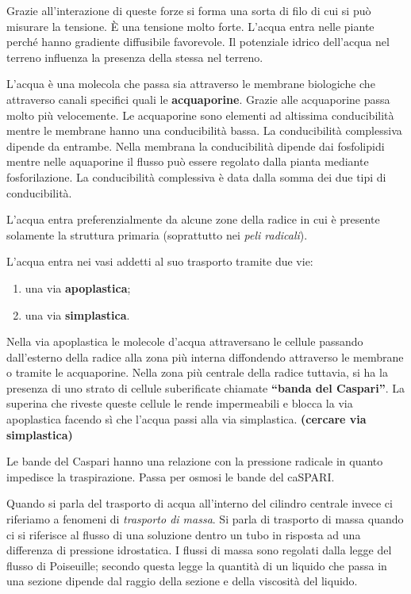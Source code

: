 \documentclass[]{article}
\begin{document}
Grazie all'interazione di queste forze si forma una sorta di filo di cui
si può misurare la tensione. È una tensione molto forte. L'acqua entra
nelle piante perché hanno gradiente diffusibile favorevole. Il
potenziale idrico dell'acqua nel terreno influenza la presenza della
stessa nel terreno.

L'acqua è una molecola che passa sia attraverso le membrane biologiche
che attraverso canali specifici quali le \textbf{acquaporine}. Grazie
alle acquaporine passa molto più velocemente. Le acquaporine sono
elementi ad altissima conducibilità mentre le membrane hanno una
conducibilità bassa. La conducibilità complessiva dipende da entrambe.
Nella membrana la conducibilità dipende dai fosfolipidi mentre nelle
aquaporine il flusso può essere regolato dalla pianta mediante
fosforilazione. La conducibilità complessiva è data dalla somma dei due
tipi di conducibilità.

L'acqua entra preferenzialmente da alcune zone della radice in cui è
presente solamente la struttura primaria (soprattutto nei \emph{peli
radicali}).

L'acqua entra nei vasi addetti al suo trasporto tramite due vie:

\begin{enumerate}
\def\labelenumi{\arabic{enumi}.}
\itemsep1pt\parskip0pt
\item
  una via \textbf{apoplastica};
\item
  una via \textbf{simplastica}.
\end{enumerate}

Nella via apoplastica le molecole d'acqua attraversano le cellule
passando dall'esterno della radice alla zona più interna diffondendo
attraverso le membrane o tramite le acquaporine. Nella zona più centrale
della radice tuttavia, si ha la presenza di uno strato di cellule
suberificate chiamate \textbf{``banda del Caspari''}. La superina che
riveste queste cellule le rende impermeabili e blocca la via apoplastica
facendo sì che l'acqua passi alla via simplastica. \textbf{(cercare via
simplastica)}

Le bande del Caspari hanno una relazione con la pressione radicale in
quanto impedisce la traspirazione. Passa per osmosi le bande del
caSPARI.

Quando si parla del trasporto di acqua all'interno del cilindro centrale
invece ci riferiamo a fenomeni di \emph{trasporto di massa}. Si parla di
trasporto di massa quando ci si riferisce al flusso di una soluzione
dentro un tubo in risposta ad una differenza di pressione idrostatica. I
flussi di massa sono regolati dalla legge del flusso di Poiseuille;
secondo questa legge la quantità di un liquido che passa in una sezione
dipende dal raggio della sezione e della viscosità del liquido.
\end{document}
